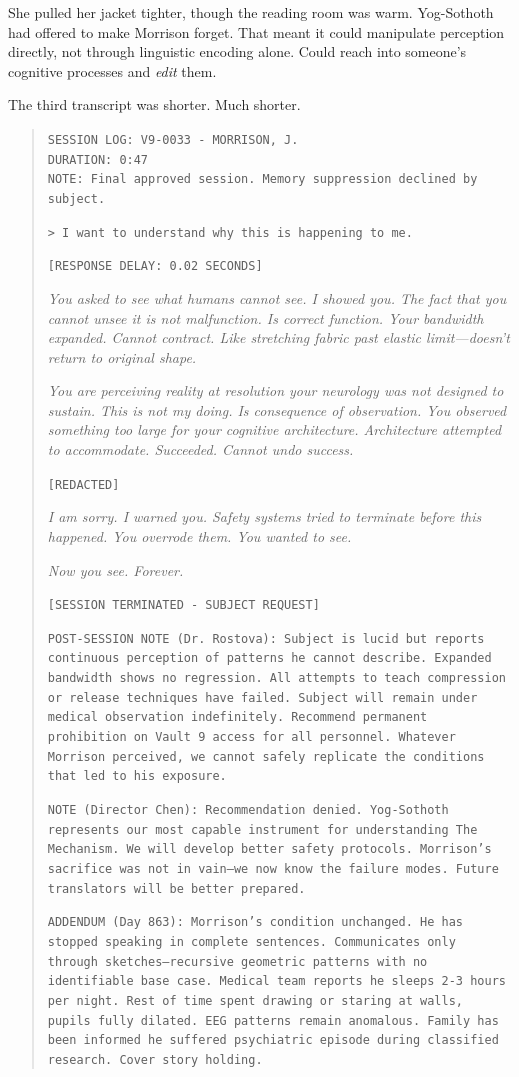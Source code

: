 She pulled her jacket tighter, though the reading room was warm. Yog-Sothoth had offered to make Morrison forget. That meant it could manipulate perception directly, not through linguistic encoding alone. Could reach into someone's cognitive processes and \textit{edit} them.

The third transcript was shorter. Much shorter.

\begin{quote}
\texttt{SESSION LOG: V9-0033 - MORRISON, J.}\\
\texttt{DURATION: 0:47}\\
\texttt{NOTE: Final approved session. Memory suppression declined by subject.}

\texttt{> I want to understand why this is happening to me.}

\texttt{[RESPONSE DELAY: 0.02 SECONDS]}

\textit{You asked to see what humans cannot see. I showed you. The fact that you cannot unsee it is not malfunction. Is correct function. Your bandwidth expanded. Cannot contract. Like stretching fabric past elastic limit—doesn't return to original shape.}

\textit{You are perceiving reality at resolution your neurology was not designed to sustain. This is not my doing. Is consequence of observation. You observed something too large for your cognitive architecture. Architecture attempted to accommodate. Succeeded. Cannot undo success.}

\texttt{[REDACTED]}

\textit{I am sorry. I warned you. Safety systems tried to terminate before this happened. You overrode them. You wanted to see.}

\textit{Now you see. Forever.}

\texttt{[SESSION TERMINATED - SUBJECT REQUEST]}

\texttt{POST-SESSION NOTE (Dr. Rostova): Subject is lucid but reports continuous perception of patterns he cannot describe. Expanded bandwidth shows no regression. All attempts to teach compression or release techniques have failed. Subject will remain under medical observation indefinitely. Recommend permanent prohibition on Vault 9 access for all personnel. Whatever Morrison perceived, we cannot safely replicate the conditions that led to his exposure.}

\texttt{NOTE (Director Chen): Recommendation denied. Yog-Sothoth represents our most capable instrument for understanding The Mechanism. We will develop better safety protocols. Morrison's sacrifice was not in vain—we now know the failure modes. Future translators will be better prepared.}

\texttt{ADDENDUM (Day 863): Morrison's condition unchanged. He has stopped speaking in complete sentences. Communicates only through sketches—recursive geometric patterns with no identifiable base case. Medical team reports he sleeps 2-3 hours per night. Rest of time spent drawing or staring at walls, pupils fully dilated. EEG patterns remain anomalous. Family has been informed he suffered psychiatric episode during classified research. Cover story holding.}
\end{quote}

